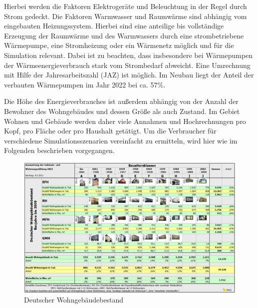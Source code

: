 Hierbei werden die Faktoren Elektrogeräte und Beleuchtung in der Regel durch Strom gedeckt. 
Die Faktoren Warmwasser und Raumwärme sind abhängig vom eingebauten Heizungssystem. 
Hierbei sind eine anteilige bis vollständige Erzeugung der Raumwärme und des Warmwassers durch eine strombetriebene Wärmepumpe, eine Stromheizung oder ein Wärmenetz möglich und für die Simulation relevant. 
Dabei ist zu beachten, dass insbesondere bei Wärmepumpen der Wärmeenergieverbrauch stark vom Strombedarf abweicht. 
Eine Umrechnung mit Hilfe der Jahresarbeitszahl (JAZ) ist möglich. 
Im Neubau liegt der Anteil der verbauten Wärmepumpen im Jahr 2022 bei ca. 57\%.

Die Höhe des Energieverbrauches ist außerdem abhängig von der Anzahl der Bewohner des Wohngebäudes und dessen Größe als auch Zustand. 
Im Gebiet Wohnen und Gebäude werden daher viele Annahmen und Hochrechnungen pro Kopf, pro Fläche oder pro Haushalt getätigt. Um die Verbraucher für verschiedene Simulationsszenarien vereinfacht zu ermitteln, wird hier wie im Folgenden beschrieben vorgegangen. 

\begin{figure}[h!]
    \centering
    \includegraphics[width=14cm]{Abbildungen/VerbraucherAbb2.jpg}
    \caption{Deutscher Wohngebäudebestand\cite{baualtersklassen}}\label{fig:Deutscher_Wohngebäudebestand}
\end{figure}

